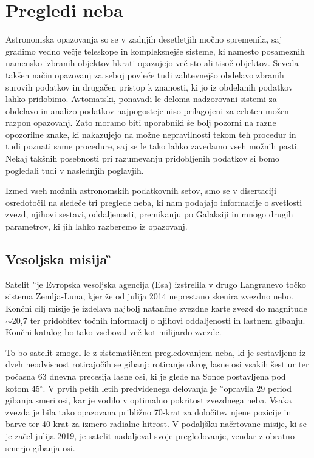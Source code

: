 \section{Pregledi neba}
\label{sec:slo_pregledi}
Astronomska opazovanja so se v zadnjih desetletjih močno spremenila, saj gradimo vedno večje teleskope in kompleksnejše sisteme, ki namesto posameznih namensko izbranih objektov hkrati opazujejo več sto ali tisoč objektov. Seveda takšen način opazovanj za seboj povleče tudi zahtevnejšo obdelavo zbranih surovih podatkov in drugačen pristop k znanosti, ki jo iz obdelanih podatkov lahko pridobimo. Avtomatski, ponavadi le deloma nadzorovani sistemi za obdelavo in analizo podatkov najpogosteje niso prilagojeni za celoten možen razpon opazovanj. Zato moramo biti uporabniki še bolj pozorni na razne opozorilne znake, ki nakazujejo na možne nepravilnosti tekom teh procedur in tudi poznati same procedure, saj se le tako lahko zavedamo vseh možnih pasti. Nekaj takšnih posebnosti pri razumevanju pridobljenih podatkov si bomo pogledali tudi v naslednjih poglavjih.

Izmed vseh možnih astronomskih podatkovnih setov, smo se v disertaciji osredotočil na sledeče tri preglede neba, ki nam podajajo informacije o svetlosti zvezd, njihovi sestavi, oddaljenosti, premikanju po Galaksiji in mnogo drugih parametrov, ki jih lahko razberemo iz opazovanj.

\subsection{Vesoljska misija \G}
\label{sec:slo_gaia}
Satelit \G\ je Evropska vesoljska agencija (Esa) izstrelila v drugo Langranevo točko sistema Zemlja-Luna, kjer že od julija 2014 neprestano skenira zvezdno nebo. Končni cilj misije je izdelava najbolj natančne zvezdne karte zvezd do magnitude $\sim$20,7 ter pridobitev točnih informacij o njihovi oddaljenosti in lastnem gibanju. Končni katalog bo tako vseboval več kot milijardo zvezde.

To bo satelit zmogel le z sistematičnem pregledovanjem neba, ki je sestavljeno iz dveh neodvisnost rotirajočih se gibanj: rotiranje okrog lasne osi vsakih šest ur ter počasna 63 dnevna precesija lasne osi, ki je glede na Sonce postavljena pod kotom 45$^\circ$. V prvih petih letih predvidenega delovanja je \G\ opravila 29 period gibanja smeri osi, kar je vodilo v optimalno pokritost zvezdnega neba. Vsaka zvezda je bila tako opazovana približno 70-krat za določitev njene pozicije in barve ter 40-krat za izmero radialne hitrost. V podaljšku načrtovane misije, ki se je začel julija 2019, je satelit nadaljeval svoje pregledovanje, vendar z obratno smerjo gibanja osi.

